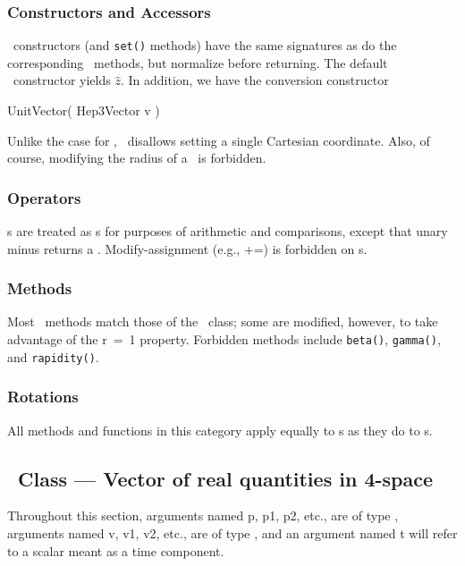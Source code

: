\subsubsection{Constructors and Accessors}

\UV\ constructors (and \verb|set()| methods)
have the same signatures as do the corresponding \SVz\ methods,
but normalize before returning.
The default \UV\ constructor yields $\hat{z}$.
In addition, we have the conversion constructor
\begin{shortlist}
  \item UnitVector( Hep3Vector v )
\end{shortlist}

\noindent
Unlike the case for \SV , \UV\ disallows setting a
single Cartesian coordinate.  Also, of course,
modifying the radius of a \UV\ is forbidden.

\subsubsection{Operators}

\UV s are treated as \SV s for purposes of arithmetic and comparisons,
except that unary minus returns a \UV .
Modify-assignment (e.g., +=) is forbidden on \UV s.

\subsubsection{Methods}
\label{unitMethods}

Most \UV\ methods match those of the \SV\ class; some are modified,
however, to take advantage of the r~=~1 property.
Forbidden methods include
\verb|beta()|, \verb|gamma()|, and \verb|rapidity()|.

\subsubsection{Rotations}

All methods and functions in this category apply equally to
\UV s as they do to \SV s.



\subsection{\protect\LV\ Class --- Vector of real quantities in 4-space}

Throughout this section,
arguments named p, p1, p2, etc., are of type \LV ,
arguments named v, v1, v2, etc., are of type \SV ,
and an argument named t will refer to a scalar meant as a time component.

